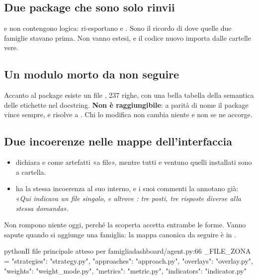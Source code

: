 \subsection{Due package che sono solo rinvii}

 e  non contengono logica:
ri-esportano \pkgPesi{} e \pkgOverlay. Sono il ricordo di dove quelle due
famiglie stavano prima. Non vanno estesi, e il codice nuovo importa dalle
cartelle vere.

\subsection{Un modulo morto da non seguire}

Accanto al package  esiste un file
, \num{237} righe, con una bella tabella della
semantica delle etichette nel docstring. \textbf{Non è raggiungibile}: a
parità di nome il package vince sempre, e  risolve a
. Chi lo modifica non cambia niente e non
se ne accorge.

\subsection{Due incoerenze nelle mappe dell'interfaccia}

\begin{itemize}
  \item {} dichiara  e
         come artefatti «a file», mentre tutti e ventuno
        quelli installati sono a cartella.
  \item {} ha la stessa incoerenza al suo interno, e i
        suoi commenti la annotano già: «\emph{Qui indicava un file singolo, e
        altrove : tre posti, tre risposte diverse alla stessa
        domanda}».
\end{itemize}

\noindent
Non rompono niente oggi, perché la scoperta accetta entrambe le forme. Vanno
sapute quando si aggiunge una famiglia: la mappa canonica da seguire è
 in .

\begin{codiceInterno}{python}{Il file principale atteso per famiglia}{dashboard/agent.py:66}
_FILE_ZONA = {"strategies": "strategy.py", "approaches": "approach.py",
              "overlays": "overlay.py", "weights": "weight_mode.py",
              "metrics": "metric.py", "indicators": "indicator.py"}
\end{codiceInterno}

